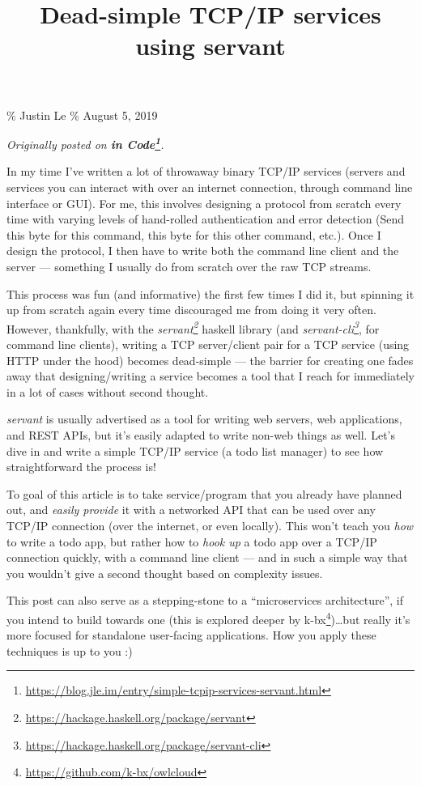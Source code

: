 \documentclass[]{article}
\title{Dead-simple TCP/IP services using servant}
\renewcommand{\href}[2]{#2\footnote{\url{#1}}}
\begin{document}
\maketitle

\% Justin Le \% August 5, 2019

\emph{Originally posted on
\textbf{\href{https://blog.jle.im/entry/simple-tcpip-services-servant.html}{in
Code}}.}

In my time I've written a lot of throwaway binary TCP/IP services (servers and
services you can interact with over an internet connection, through command line
interface or GUI). For me, this involves designing a protocol from scratch every
time with varying levels of hand-rolled authentication and error detection (Send
this byte for this command, this byte for this other command, etc.). Once I
design the protocol, I then have to write both the command line client and the
server --- something I usually do from scratch over the raw TCP streams.

This process was fun (and informative) the first few times I did it, but
spinning it up from scratch again every time discouraged me from doing it very
often. However, thankfully, with the
\emph{\href{https://hackage.haskell.org/package/servant}{servant}} haskell
library (and
\emph{\href{https://hackage.haskell.org/package/servant-cli}{servant-cli}}, for
command line clients), writing a TCP server/client pair for a TCP service (using
HTTP under the hood) becomes dead-simple --- the barrier for creating one fades
away that designing/writing a service becomes a tool that I reach for
immediately in a lot of cases without second thought.

\emph{servant} is usually advertised as a tool for writing web servers, web
applications, and REST APIs, but it's easily adapted to write non-web things as
well. Let's dive in and write a simple TCP/IP service (a todo list manager) to
see how straightforward the process is!

To goal of this article is to take service/program that you already have planned
out, and \emph{easily provide} it with a networked API that can be used over any
TCP/IP connection (over the internet, or even locally). This won't teach you
\emph{how} to write a todo app, but rather how to \emph{hook up} a todo app over
a TCP/IP connection quickly, with a command line client --- and in such a simple
way that you wouldn't give a second thought based on complexity issues.

This post can also serve as a stepping-stone to a ``microservices
architecture'', if you intend to build towards one (this is explored deeper by
\href{https://github.com/k-bx/owlcloud}{k-bx})\ldots but really it's more
focused for standalone user-facing applications. How you apply these techniques
is up to you :)
\end{document}
